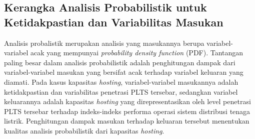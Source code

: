 
\subsection{Kerangka Analisis Probabilistik untuk Ketidakpastian dan Variabilitas Masukan}
Analisis probalistik merupakan analisis yang masukannya berupa variabel-variabel acak yang mempunyai \textit{probability density function} (PDF)\cite{dantzig_linear_2011}. Tantangan paling besar dalam analisis probabilistik adalah penghitungan dampak dari variabel-variabel masukan yang bersifat acak terhadap variabel keluaran yang diamati. Pada kasus kapasitas \textit{hosting}, variabel-variabel masukannya adalah ketidakpastian dan variabilitas penetrasi PLTS tersebar, sedangkan variabel keluarannya adalah kapasitas \textit{hosting} yang direpresentasikan oleh level penetrasi PLTS tersebar terhadap indeks-indeks performa operasi sistem distribusi tenaga listrik. Penghitungan dampak masukan terhadap keluaran tersebut menentukan kualitas analisis probabilistik dari kapasitas \textit{hosting}. 

